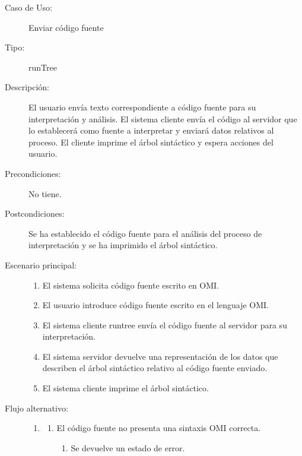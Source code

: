 \begin{description}
   \item[Caso de Uso:]  Enviar código fuente 
   \item [Tipo:] runTree
   \item[Descripción:] 
   El usuario envía  texto correspondiente a código fuente para su interpretación y análisis. 
   El sistema cliente envía el código al servidor que lo establecerá como fuente a interpretar y enviará
   datos relativos al proceso.
   El cliente imprime el árbol sintáctico y espera acciones del usuario.
   \item[Precondiciones:] 
   No tiene.
   \item[Postcondiciones:] 
   Se ha establecido el código fuente para el análisis del proceso de interpretación y se ha imprimido el árbol sintáctico. 
   \item[Escenario principal:] \hfill
   \begin{enumerate}
   \item El sistema solicita  código fuente escrito en OMI.
   \item El usuario introduce código fuente escrito en el lenguaje OMI.
   \item El sistema cliente runtree envía el código fuente al servidor para su interpretación.
   \item El sistema servidor devuelve una representación de los datos que describen el árbol sintáctico relativo al código fuente enviado.
   \item El sistema cliente imprime el árbol sintáctico. 
   \end{enumerate}
   \item[Flujo alternativo:] \hfill 
   \begin{enumerate} \itemsep1pt \parskip0pt 
   \setcounter{enumi}{3}
   \renewcommand{\labelenumi}{}
   \renewcommand{\labelenumiii}{\arabic{enumiii}.}
   \renewcommand{\labelenumii}{\arabic{enumi}\alph{enumii}.}
      \item 
      \begin {enumerate}
         \setcounter{enumii}{0}
         \item El código fuente no presenta una sintaxis OMI correcta.
         \begin{enumerate}
         \item Se devuelve un estado de error.
         \end{enumerate}
      \end{enumerate}
   \end{enumerate}

\end{description}

